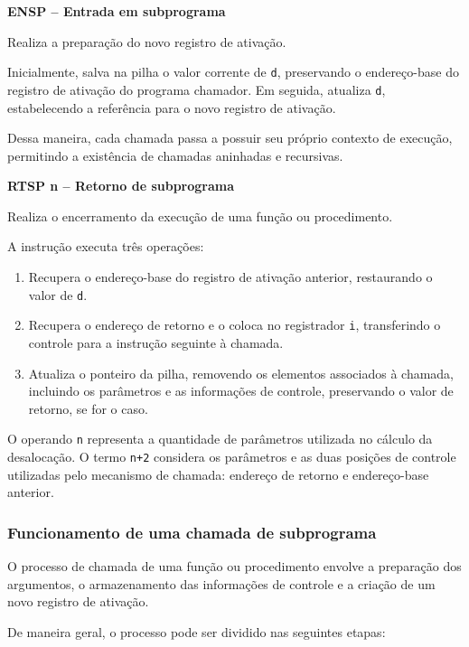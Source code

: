 \documentclass[
  brazilian,
  letterpaper,
]{book}
\providecommand{\tightlist}{%
  \setlength{\itemsep}{0pt}\setlength{\parskip}{0pt}}
\theoremstyle{plain}
\theoremstyle{definition}
\theoremstyle{remark}
\begin{document}
\textbf{ENSP -- Entrada em subprograma}

Realiza a preparação do novo registro de ativação.

Inicialmente, salva na pilha o valor corrente de \texttt{d}, preservando
o endereço-base do registro de ativação do programa chamador. Em
seguida, atualiza \texttt{d}, estabelecendo a referência para o novo
registro de ativação.

Dessa maneira, cada chamada passa a possuir seu próprio contexto de
execução, permitindo a existência de chamadas aninhadas e recursivas.

\textbf{RTSP n -- Retorno de subprograma}

Realiza o encerramento da execução de uma função ou procedimento.

A instrução executa três operações:

\begin{enumerate}
\def\labelenumi{\arabic{enumi}.}
\tightlist
\item
  Recupera o endereço-base do registro de ativação anterior, restaurando
  o valor de \texttt{d}.
\item
  Recupera o endereço de retorno e o coloca no registrador \texttt{i},
  transferindo o controle para a instrução seguinte à chamada.
\item
  Atualiza o ponteiro da pilha, removendo os elementos associados à
  chamada, incluindo os parâmetros e as informações de controle,
  preservando o valor de retorno, se for o caso.
\end{enumerate}

O operando \texttt{n} representa a quantidade de parâmetros utilizada no
cálculo da desalocação. O termo \texttt{n+2} considera os parâmetros e
as duas posições de controle utilizadas pelo mecanismo de chamada:
endereço de retorno e endereço-base anterior.

\subsubsection{Funcionamento de uma chamada de
subprograma}\label{funcionamento-de-uma-chamada-de-subprograma}

O processo de chamada de uma função ou procedimento envolve a preparação
dos argumentos, o armazenamento das informações de controle e a criação
de um novo registro de ativação.

De maneira geral, o processo pode ser dividido nas seguintes etapas:
\end{document}
